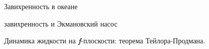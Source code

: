 \begin{chapter}{Завихренность в океане}
\begin{section}{завихренность и Экмановский насос}
\begin{paragraph}{Динамика жидкости на \textbf{\textit{f}}-плоскости: 
теорема Тейлора-Продмана.}
%


\end{paragraph}
\end{section}
\end{chapter}
